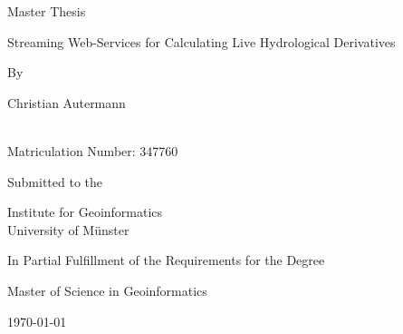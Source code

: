 
\begin{spacing}{1}
  \begin{center}
    \begin{large}
      \begin{bold}
        Master Thesis\\
      \end{bold}
      \vspace*{\fill}
      \begin{huge}
        \begin{bold}
          \begin{sansserif}
            Streaming Web-Services for Calculating Live Hydrological Derivatives\\
          \end{sansserif}
        \end{bold}
      \end{huge}
      \vspace*{\fill}
      \begin{italic}
        By\\
      \end{italic}
      \begin{bold}
        Christian Autermann\\
      \end{bold}
      \\
      Matriculation Number: 347760\\
      \vspace*{\fill}
      \begin{italic}
        Submitted to the\\
      \end{italic}
      Institute for Geoinformatics\\
      University of Münster\\
      \vspace*{\fill}
      \begin{italic}
        In Partial Fulfillment of the Requirements for the Degree\\
      \end{italic}
      \begin{bold}
        Master of Science in Geoinformatics\\
      \end{bold}
      \vspace*{\fill}
      \begin{bold}
        \today\\

\end{bold}
\end{large}
\end{center}
\end{spacing}
